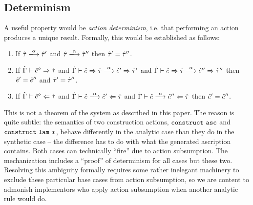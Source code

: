 \subsection{Determinism}
A useful property would be \emph{action determinism}, i.e. that performing an action produces a unique result. Formally, this would be established as follows:
\begin{enumerate}[itemsep=0px,partopsep=0px,topsep=0px]
\item If $\performTyp{\ztau}{\alpha}{\ztau'}$ and $\performTyp{\ztau}{\alpha}{\ztau''}$ then $\hat{\tau}'=\hat{\tau}''$.
\item If $\dot{\Gamma} \vdash \hat{e}^{\diamond} \Rightarrow \dot{\tau}$ and
  $\performSyn{\hGamma}{\zexp}{\htau}{\alpha}{\zexp'}{\htau'}$ and
  $\performSyn{\hGamma}{\zexp}{\htau}{\alpha}{\zexp''}{\htau''}$ then
  $\hat{e}' = \hat{e}''$ and $\dot{\tau}' = \dot{\tau}''$.

\item If $\dot{\Gamma} \vdash \hat{e}^{\diamond} \Leftarrow \dot{\tau}$ and
  $\performAna{\hGamma}{\zexp}{\htau}{\alpha}{\zexp'}$ and
  $\performAna{\hGamma}{\zexp}{\htau}{\alpha}{\zexp''}$ then $\hat{e}' =
  \hat{e}''$.
\end{enumerate}

This is not a theorem of the system as described in this paper. The reason is quite subtle: the semantics of two construction actions, $\mathtt{construct}~\mathtt{asc}$ and $\mathtt{construct}~\mathtt{lam}~x$, behave differently in the analytic case than they do in the synthetic case -- the difference has to do with what the generated ascription contains. Both cases can technically ``fire'' due to action subsumption. The mechanization includes a ``proof'' of determinism for all cases but these two. Resolving this ambiguity formally requires some rather inelegant machinery to exclude these particular base cases from action subsumption, so we are content to admonish implementors who apply action subsumption when another analytic rule would do. 